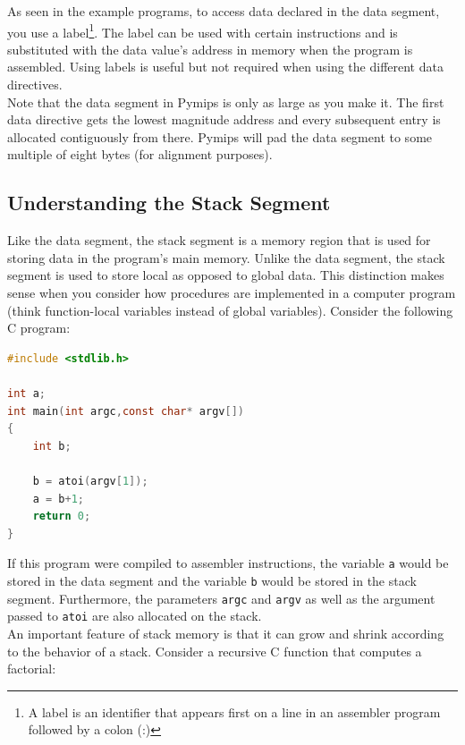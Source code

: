 \documentclass[12pt]{article}
\begin{document}


As seen in the example programs, to access data declared in the data segment,
     you use a label\footnote{A label is an identifier that appears first on a
     line in an assembler program followed by a colon (:)}. The label can be
     used with certain instructions and is substituted with the data value's
     address in memory when the program is assembled. Using labels is useful but
     not required when using the different data directives.\\

Note that the data segment in Pymips is only as large as you make it. The first
     data directive gets the lowest magnitude address and every subsequent entry
     is allocated contiguously from there. Pymips will pad the data segment to
     some multiple of eight bytes (for alignment purposes).

\subsection{Understanding the Stack Segment}

Like the data segment, the stack segment is a memory region that is used for
     storing data in the program's main memory. Unlike the data segment, the
     stack segment is used to store local as opposed to global data. This
     distinction makes sense when you consider how procedures are implemented in
     a computer program (think function-local variables instead of global
     variables). Consider the following C program:\\

\begin{lstlisting}[language=C]
#include <stdlib.h>

int a;
int main(int argc,const char* argv[])
{
    int b;

    b = atoi(argv[1]);
    a = b+1;
    return 0;
}
\end{lstlisting}

If this program were compiled to assembler instructions, the variable \texttt{a}
     would be stored in the data segment and the variable \texttt{b} would be
     stored in the stack segment. Furthermore, the parameters \texttt{argc} and
     \texttt{argv} as well as the argument passed to \texttt{atoi} are also
     allocated on the stack.\\

An important feature of stack memory is that it can grow and shrink according to
     the behavior of a stack. Consider a recursive C function that computes a
     factorial:\\
\end{document}
